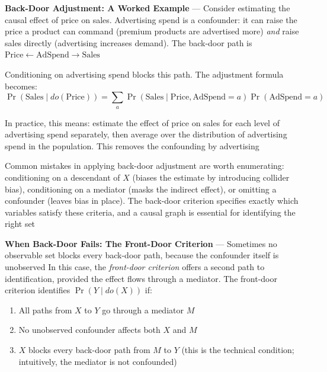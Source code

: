 \textbf{Back-Door Adjustment: A Worked Example} --- Consider estimating the causal
effect of price on sales. Advertising spend is a confounder: it can raise the price
a product can command (premium products are advertised more) \emph{and} raise
sales directly (advertising increases demand). The back-door path is $\text{Price}
\leftarrow \text{AdSpend}\to \text{Sales}$

Conditioning on advertising spend blocks this path. The adjustment formula becomes:
\begin{equation}
  \Pr(\text{Sales}\mid do(\text{Price})) = \sum_{a}\Pr(\text{Sales}\mid \text{Price}
  , \text{AdSpend}= a) \Pr(\text{AdSpend}= a) \label{eq:price-sales-adjustment}
\end{equation}

In practice, this means: estimate the effect of price on sales for each level of
advertising spend separately, then average over the distribution of advertising
spend in the population. This removes the confounding by advertising

Common mistakes in applying back-door adjustment are worth enumerating: conditioning
on a descendant of $X$ (biases the estimate by introducing collider bias),
conditioning on a mediator (masks the indirect effect), or omitting a confounder
(leaves bias in place). The back-door criterion specifies exactly which
variables satisfy these criteria, and a causal graph is essential for identifying
the right set


\textbf{When Back-Door Fails: The Front-Door Criterion} --- Sometimes no
observable set blocks every back-door path, because the confounder itself is unobserved
In this case, the \emph{front-door criterion} offers a second path to identification,
provided the effect flows through a mediator. The front-door criterion identifies
$\Pr(Y \mid do(X))$ if:

\begin{enumerate}
  \item All paths from $X$ to $Y$ go through a mediator $M$

  \item No unobserved confounder affects both $X$ and $M$

  \item $X$ blocks every back-door path from $M$ to $Y$ (this is the technical
    condition; intuitively, the mediator is not confounded)
\end{enumerate}

